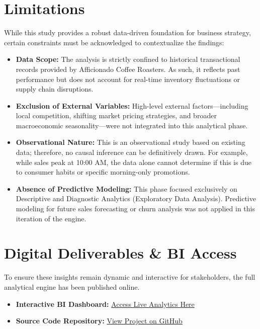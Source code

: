 \documentclass[12pt, a4paper]{article}
\begin{document}
\section{Limitations}
While this study provides a robust data-driven foundation for business strategy, certain constraints must be acknowledged to contextualize the findings:

\begin{itemize}
    \item \textbf{Data Scope:} The analysis is strictly confined to historical transactional records provided by Afficionado Coffee Roasters. As such, it reflects past performance but does not account for real-time inventory fluctuations or supply chain disruptions.
    \item \textbf{Exclusion of External Variables:} High-level external factors—including local competition, shifting market pricing strategies, and broader macroeconomic seasonality—were not integrated into this analytical phase.
    \item \textbf{Observational Nature:} This is an observational study based on existing data; therefore, no causal inference can be definitively drawn. For example, while sales peak at 10:00 AM, the data alone cannot determine if this is due to consumer habits or specific morning-only promotions.
    \item \textbf{Absence of Predictive Modeling:} This phase focused exclusively on Descriptive and Diagnostic Analytics (Exploratory Data Analysis). Predictive modeling for future sales forecasting or churn analysis was not applied in this iteration of the engine.
\end{itemize}

\section*{Digital Deliverables \& BI Access}
To ensure these insights remain dynamic and interactive for stakeholders, the full analytical engine has been published online.
\begin{itemize}
    \item \textbf{Interactive BI Dashboard:} \href{https://afficionado-roasters-bi-dashboard-gxhznyk5jednzcbb5hhygk.streamlit.app/}{Access Live Analytics Here}
    \item \textbf{Source Code Repository:} \href{https://github.com/Debayanmal2002-official/Afficionado-Roasters-BI-Dashboard}{View Project on GitHub}
\end{itemize}
	
\end{document}
